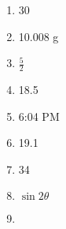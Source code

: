 \documentclass[../uilmath.tex]{subfiles}
\begin{document}
\begin{enumerate}[label=\bfseries\arabic*.]
    \item %
    30

    \item %
    10.008 g 

    \item %
    $\frac{5}{2}$

    \item %
    18.5

    \item %
    6:04 PM 

    \item %
    19.1

    \item %
    34

    \item %
    $\sin2\theta$

    \item %
    
\end{enumerate}
\end{document}
